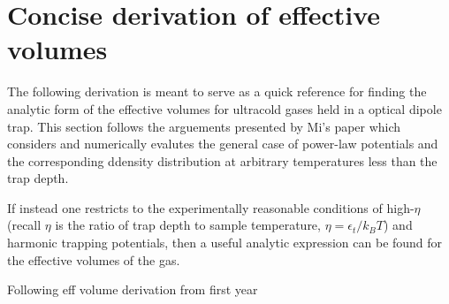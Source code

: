 \chapter{Concise derivation of effective volumes}
\label{ch:effective_volumes}

The following derivation is meant to serve as a quick reference for finding the analytic form of the effective volumes for ultracold gases held in a optical dipole trap. This section follows the arguements presented by Mi's paper which considers and numerically evalutes the general case of power-law potentials and the corresponding ddensity distribution at arbitrary temperatures less than the trap depth.

If instead one restricts to the experimentally reasonable conditions of high-$\eta$ (recall $\eta$ is the ratio of trap depth to sample temperature, $\eta=\epsilon_t/k_B T$) and harmonic trapping potentials, then a useful analytic expression can be found for the effective volumes of the gas.

Following eff volume derivation from first year